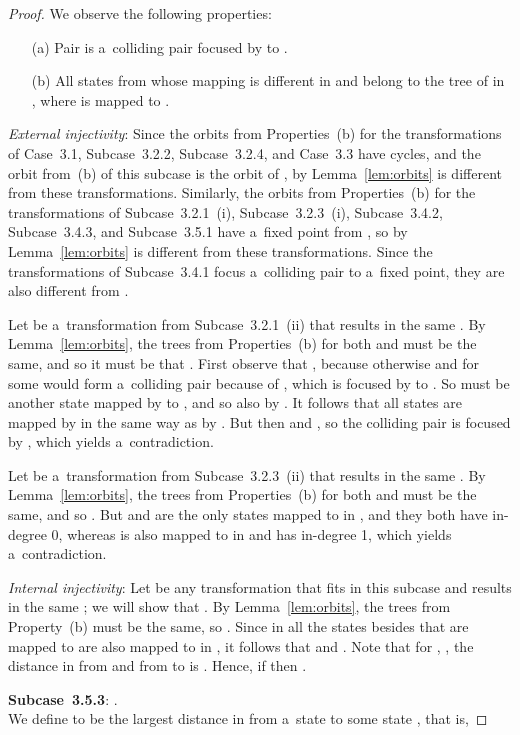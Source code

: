 \documentclass{amsart}
\begin{document}
\begin{proof}
We observe the following properties:
\begin{enumerate}
\item[(a)] Pair  is a~colliding pair focused by  to .

\item[(b)] All states from  whose mapping is different in  and  belong to the tree of  in , where  is mapped to .
\end{enumerate}

\textit{External injectivity}:
Since the orbits from Properties~(b) for the transformations of Case~3.1, Subcase~3.2.2, Subcase~3.2.4, and Case~3.3 have cycles, and the orbit from~(b) of this subcase is the orbit of , by Lemma~\ref{lem:orbits}  is different from these transformations.
Similarly, the orbits from Properties~(b) for the transformations of Subcase~3.2.1~(i), Subcase~3.2.3~(i), Subcase~3.4.2, Subcase~3.4.3, and Subcase~3.5.1 have a~fixed point from , so by Lemma~\ref{lem:orbits}  is different from these transformations.
Since the transformations of Subcase~3.4.1 focus a~colliding pair to a~fixed point, they are also different from .

Let  be a~transformation from Subcase~3.2.1~(ii) that results in the same .
By Lemma~\ref{lem:orbits}, the trees from Properties~(b) for both  and  must be the same, and so it must be that .
First observe that , because otherwise  and  for some  would form a~colliding pair because of , which is focused by  to .
So  must be another state mapped by  to , and so also by .
It follows that all states  are mapped by  in the same way as by .
But then  and , so the colliding pair  is focused by , which yields a~contradiction.

Let  be a~transformation from Subcase~3.2.3~(ii) that results in the same .
By Lemma~\ref{lem:orbits}, the trees from Properties~(b) for both  and  must be the same, and so .
But  and  are the only states mapped to  in , and they both have in-degree 0, whereas  is also mapped to  in  and has in-degree 1, which yields a~contradiction.

\textit{Internal injectivity}:
Let  be any transformation that fits in this subcase and results in the same ; we will show that .
By Lemma~\ref{lem:orbits}, the trees from Property~(b) must be the same, so .
Since in  all the states besides  that are mapped to  are also mapped to  in , it follows that  and .
Note that for , , the distance in  from  and from  to  is .
Hence, if  then .

\textbf{Subcase~3.5.3}: .\\
We define  to be the largest distance in  from a~state  to some state , that is,


\end{proof}
\end{document}

